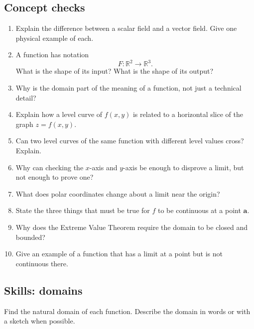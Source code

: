 \subsection*{Concept checks}

\begin{enumerate}
\item Explain the difference between a scalar field and a vector field.  Give one
physical example of each.

\item A function has notation
\[
    F:\mathbb R^2\to\mathbb R^3.
\]
What is the shape of its input?  What is the shape of its output?

\item Why is the domain part of the meaning of a function, not just a technical detail?

\item Explain how a level curve of \(f(x,y)\) is related to a horizontal slice of the graph
\(z=f(x,y)\).

\item Can two level curves of the same function with different level values cross?
Explain.

\item Why can checking the \(x\)-axis and \(y\)-axis be enough to disprove a limit, but
not enough to prove one?

\item What does polar coordinates change about a limit near the origin?

\item State the three things that must be true for \(f\) to be continuous at a point
\(\mathbf a\).

\item Why does the Extreme Value Theorem require the domain to be closed and
bounded?

\item Give an example of a function that has a limit at a point but is not continuous
there.
\end{enumerate}

\subsection*{Skills: domains}

Find the natural domain of each function.  Describe the domain in words or with a
sketch when possible.

